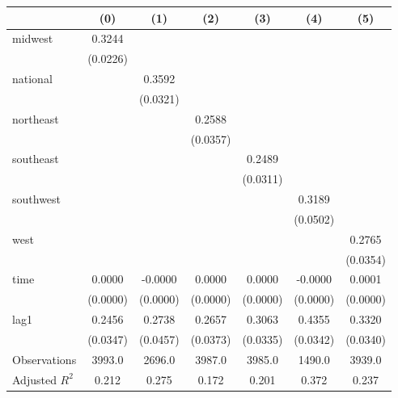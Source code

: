 \begin{tabular}{lcccccc}
\toprule
 & (0) & (1) & (2) & (3) & (4) & (5) \\
\midrule
midwest & 0.3244 &  &  &  &  &  \\
\vspace{0.2cm}
 & (0.0226) &  &  &  &  &  \\
national &  & 0.3592 &  &  &  &  \\
\vspace{0.2cm}
 &  & (0.0321) &  &  &  &  \\
northeast &  &  & 0.2588 &  &  &  \\
\vspace{0.2cm}
 &  &  & (0.0357) &  &  &  \\
southeast &  &  &  & 0.2489 &  &  \\
\vspace{0.2cm}
 &  &  &  & (0.0311) &  &  \\
southwest &  &  &  &  & 0.3189 &  \\
\vspace{0.2cm}
 &  &  &  &  & (0.0502) &  \\
west &  &  &  &  &  & 0.2765 \\
\vspace{0.2cm}
 &  &  &  &  &  & (0.0354) \\
time & 0.0000 & -0.0000 & 0.0000 & 0.0000 & -0.0000 & 0.0001 \\
\vspace{0.2cm}
 & (0.0000) & (0.0000) & (0.0000) & (0.0000) & (0.0000) & (0.0000) \\
lag1 & 0.2456 & 0.2738 & 0.2657 & 0.3063 & 0.4355 & 0.3320 \\
\vspace{0.2cm}
 & (0.0347) & (0.0457) & (0.0373) & (0.0335) & (0.0342) & (0.0340) \\
\midrule
Observations & 3993.0 & 2696.0 & 3987.0 & 3985.0 & 1490.0 & 3939.0 \\
Adjusted $R^2$ & 0.212 & 0.275 & 0.172 & 0.201 & 0.372 & 0.237 \\
\bottomrule
\end{tabular}